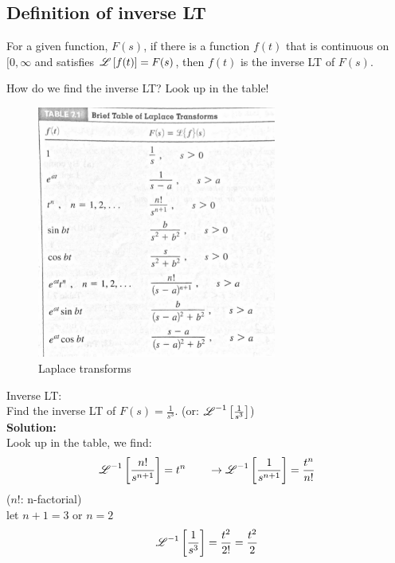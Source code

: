 \subsection{Definition of inverse LT}
For a given function, $F(s)$, if there is a function $f(t)$ that is continuous on $[0,\infty$ and satisfies $\operatorname{\mathscr{L}}\left[f(t)\right]=F(s)$, then $f(t)$ is the inverse LT of $F(s)$.\par
How do we find the inverse LT? Look up in the table! 
 \begin{figure}
\centering
\includegraphics[width=0.7\textwidth]{figs/LaplaceIdentities.png}  
\caption{Laplace transforms}
\end{figure}




\begin{exmp}{Inverse LT:}\\
Find the inverse LT of $F(s)=\frac{1}{s^3}$. (or: $\operatorname{\mathscr{L}}^{-1}\left[\frac{1}{s^3}\right]$)\\
\textbf{Solution:}\\
Look up in the table, we find:
\begin{align*}
\operatorname{\mathscr{L}}^{-1}\left[\frac{n!}{s^{n+1}}\right]=t^n \qquad \rightarrow \operatorname{\mathscr{L}}^{-1}\left[\frac{1}{s^{n+1}}\right]=\frac{t^n}{n!}
\end{align*}
($n!$: n-factorial)\\
let $n+1=3$ or $n=2$
\begin{align*}
\operatorname{\mathscr{L}}^{-1}\left[\frac{1}{s^{3}}\right]=\frac{t^2}{2!}=\frac{t^2}{2}
\end{align*}
\end{exmp}




